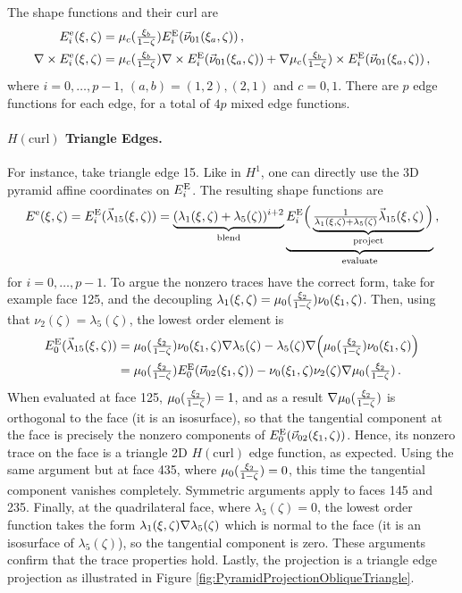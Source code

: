 The shape functions and their curl are
\begin{equation}
	\begin{aligned}
		E_i^\mathrm{e}(\xi,\zeta)&=\mu_c(\textstyle{\frac{\xi_b}{1-\zeta}})E_i^{\mathrm{E}}(\vec{\nu}_{01}(\xi_a,\zeta))\,,\\
    	\nabla\times E_i^\mathrm{e}(\xi,\zeta)&=\mu_c(\textstyle{\frac{\xi_b}{1-\zeta}})\nabla\times E_i^{\mathrm{E}}(\vec{\nu}_{01}(\xi_a,\zeta))
        +\nabla\mu_c(\textstyle{\frac{\xi_b}{1-\zeta}})\times E_i^{\mathrm{E}}(\vec{\nu}_{01}(\xi_a,\zeta))\,,	
	\end{aligned}
	\label{eq:PyrHcurlMixedEdge}
\end{equation}
where $i=0,\ldots,p-1$, $(a,b)=(1,2),(2,1)$ and $c=0,1$.
There are $p$ edge functions for each edge, for a total of $4p$ mixed edge functions.

\paragraph{\texorpdfstring{$H(\mathrm{curl})$}{Hcurl} Triangle Edges.}
For instance, take triangle edge 15.
Like in $H^1$, one can directly use the 3D pyramid affine coordinates on $E_i^{\mathrm{E}}$.
The resulting shape functions are
\begin{equation*}
	E^\mathrm{e}(\xi,\zeta)=E_i^{\mathrm{E}}(\vec{\lambda}_{15}(\xi,\zeta))=
		\underbrace{(\lambda_1(\xi,\zeta)+\lambda_5(\zeta))^{i+2}}_{\text{blend}}
    	\underbrace{E_i^{\mathrm{E}}\Big(\underbrace{\textstyle{\frac{1}{\lambda_1(\xi,\zeta)+\lambda_5(\zeta)}}
    		\vec{\lambda}_{15}(\xi,\zeta)}_{\text{project}}\Big)}_{\text{evaluate}}\,,
\end{equation*}
for $i=0,\ldots,p-1$.
To argue the nonzero traces have the correct form, take for example face 125, and the decoupling $\lambda_1(\xi,\zeta)=\mu_0(\textstyle{\frac{\xi_2}{1-\zeta}})\nu_0(\xi_1,\zeta)$.
Then, using that $\nu_2(\zeta)=\lambda_5(\zeta)$, the lowest order element is
\begin{equation*}
\begin{aligned}
	E_0^{\mathrm{E}}(\vec{\lambda}_{15}(\xi,\zeta))
		&=\mu_0(\textstyle{\frac{\xi_2}{1-\zeta}})\nu_0(\xi_1,\zeta)\nabla\lambda_5(\zeta)-\lambda_5(\zeta)\nabla\Big(\mu_0(\textstyle{\frac{\xi_2}{1-\zeta}})\nu_0(\xi_1,\zeta)\Big)\\
			&=\mu_0(\textstyle{\frac{\xi_2}{1-\zeta}})E_0^{\mathrm{E}}(\vec{\nu}_{02}(\xi_1,\zeta))-\nu_0(\xi_1,\zeta)\nu_2(\zeta)\nabla\mu_0(\textstyle{\frac{\xi_2}{1-\zeta}})\,.
\end{aligned}
\end{equation*}
When evaluated at face 125, $\mu_0(\textstyle{\frac{\xi_2}{1-\zeta}})=1$, and as a result $\nabla\mu_0(\textstyle{\frac{\xi_2}{1-\zeta}})$ is orthogonal to the face (it is an isosurface), so that the tangential component at the face is precisely the nonzero components of $E_0^{\mathrm{E}}(\vec{\nu}_{02}(\xi_1,\zeta))$.
Hence, its nonzero trace on the face is a triangle 2D $H(\mathrm{curl})$ edge function, as expected.
Using the same argument but at face 435, where $\mu_0(\textstyle{\frac{\xi_2}{1-\zeta}})=0$, this time the tangential component vanishes completely.  
Symmetric arguments apply to faces 145 and 235.
Finally, at the quadrilateral face, where $\lambda_5(\zeta)=0$, the lowest order function takes the form $\lambda_1(\xi,\zeta)\nabla\lambda_5(\zeta)$ which is normal to the face (it is an isosurface of $\lambda_5(\zeta)$), so the tangential component is zero.
These arguments confirm that the trace properties hold.
Lastly, the projection is a triangle edge projection as illustrated in Figure \ref{fig:PyramidProjectionObliqueTriangle}.

